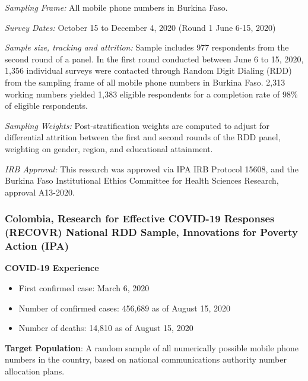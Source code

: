 \documentclass[
  12pt,
]{article}
\begin{document}
\emph{Sampling Frame:} All mobile phone numbers in Burkina Faso.

\emph{Survey Dates:} October 15 to December 4, 2020 (Round 1 June 6-15, 2020)

\emph{Sample size, tracking and attrition:} Sample includes 977 respondents from the second round of a panel. In the first round conducted between June 6 to 15, 2020, 1,356 individual surveys were contacted through Random Digit Dialing (RDD) from the sampling frame of all mobile phone numbers in Burkina Faso. 2,313 working numbers yielded 1,383 eligible respondents for a completion rate of 98\% of eligible respondents.

\emph{Sampling Weights:} Post-stratification weights are computed to adjust for differential attrition between the first and second rounds of the RDD panel, weighting on gender, region, and educational attainment.

\emph{IRB Approval:} This research was approved via IPA IRB Protocol 15608, and the Burkina Faso Institutional Ethics Committee for Health Sciences Research, approval A13-2020.

\hypertarget{colombia-research-for-effective-covid-19-responses-recovr-national-rdd-sample-innovations-for-poverty-action-ipa}{%
\subsubsection*{Colombia, Research for Effective COVID-19 Responses (RECOVR) National RDD Sample, Innovations for Poverty Action (IPA)}\label{colombia-research-for-effective-covid-19-responses-recovr-national-rdd-sample-innovations-for-poverty-action-ipa}}

\textbf{COVID-19 Experience}

\begin{itemize}
\item First confirmed case: March 6, 2020
\item Number of confirmed cases:  456,689 as of August 15, 2020
\item Number of deaths:  14,810 as of August 15, 2020
\end{itemize}

\textbf{Target Population}: A random sample of all numerically possible mobile phone numbers in the country, based on national communications authority number allocation plans.
\end{document}
